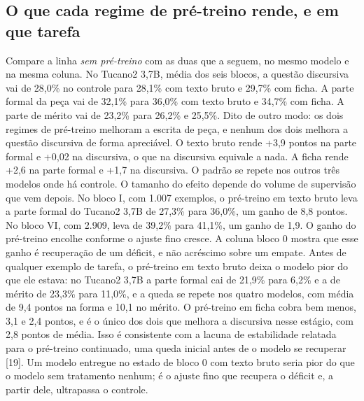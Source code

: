 \documentclass{IOS-Book-Article}
\begin{document}
\subsection{O que cada regime de pré-treino rende, e em que tarefa}
Compare a linha \emph{sem pré-treino} com as duas que a seguem, no mesmo modelo e na mesma coluna. No Tucano2 3,7B, média dos seis blocos, a questão discursiva vai de 28,0\% no controle para 28,1\% com texto bruto e 29,7\% com ficha. A parte formal da peça vai de 32,1\% para 36,0\% com texto bruto e 34,7\% com ficha. A parte de mérito vai de 23,2\% para 26,2\% e 25,5\%.
Dito de outro modo: os dois regimes de pré-treino melhoram a escrita de peça, e nenhum dos dois melhora a questão discursiva de forma apreciável. O texto bruto rende +3,9 pontos na parte formal e +0,02 na discursiva, o que na discursiva equivale a nada. A ficha rende +2,6 na parte formal e +1,7 na discursiva. O padrão se repete nos outros três modelos onde há controle. O tamanho do efeito depende do volume de supervisão que vem depois. No bloco I, com 1.007 exemplos, o pré-treino em texto bruto leva a parte formal do Tucano2 3,7B de 27,3\% para 36,0\%, um ganho de 8,8 pontos. No bloco VI, com 2.909, leva de 39,2\% para 41,1\%, um ganho de 1,9. O ganho do pré-treino encolhe conforme o ajuste fino cresce.
A coluna bloco 0 mostra que esse ganho é recuperação de um déficit, e não acréscimo sobre um empate. Antes de qualquer exemplo de tarefa, o pré-treino em texto bruto deixa o modelo pior do que ele estava: no Tucano2 3,7B a parte formal cai de 21,9\% para 6,2\% e a de mérito de 23,3\% para 11,0\%, e a queda se repete nos quatro modelos, com média de 9,4 pontos na forma e 10,1 no mérito. O pré-treino em ficha cobra bem menos, 3,1 e 2,4 pontos, e é o único dos dois que melhora a discursiva nesse estágio, com 2,8 pontos de média. Isso é consistente com a lacuna de estabilidade relatada para o pré-treino continuado, uma queda inicial antes de o modelo se recuperar [19]. Um modelo entregue no estado de bloco 0 com texto bruto seria pior do que o modelo sem tratamento nenhum; é o ajuste fino que recupera o déficit e, a partir dele, ultrapassa o controle.
\end{document}
